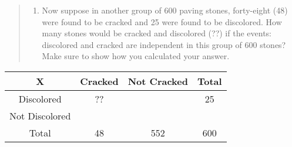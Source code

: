 \documentclass[
]{article}
\providecommand{\tightlist}{%
  \setlength{\itemsep}{0pt}\setlength{\parskip}{0pt}}
\begin{document}
\vspace{.5cm}

\begin{quote}
\begin{enumerate}
\def\labelenumi{\alph{enumi}.}
\setcounter{enumi}{6}
\tightlist
\item
  Now suppose in another group of 600 paving stones, forty-eight (48)
  were found to be cracked and 25 were found to be discolored. How many
  stones would be cracked and discolored (??) if the events: discolored
  and cracked are independent in this group of 600 stones? Make sure to
  show how you calculated your answer.
\end{enumerate}
\end{quote}

\begin{longtable}[]{@{}cccc@{}}
\toprule()
X & Cracked & Not Cracked & Total \\
\midrule()
\endhead
Discolored & ?? & & 25 \\
Not Discolored & & & \\
Total & 48 & 552 & 600 \\
\bottomrule()
\end{longtable}
\end{document}
